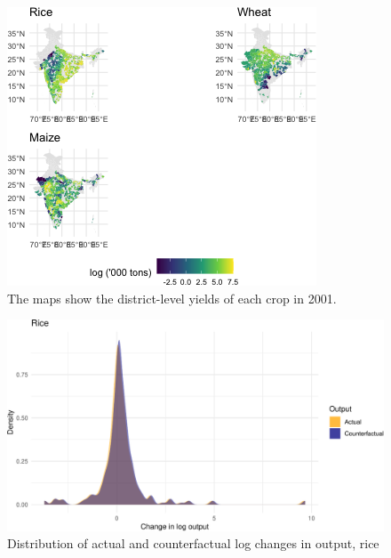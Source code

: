 \documentclass[
]{article}
\begin{document}
\FloatBarrier
\newpage

\begin{figure}
\includegraphics{draft_files/figure-latex/yielddatamaps-1} \caption[The maps show the district-level yields of each crop in 2001]{The maps show the district-level yields of each crop in 2001.}\label{fig:yielddatamaps}
\end{figure}

\FloatBarrier
\newpage

\begin{landscape}
\begin{figure}
\includegraphics{draft_files/figure-latex/yield9counterfactual1-1} \caption[Distribution of actual and counterfactual log changes in output, rice]{Distribution of actual and counterfactual log changes in output, rice}\label{fig:yield9counterfactual1}
\end{figure}
\end{landscape}

\FloatBarrier
\newpage
\end{document}
